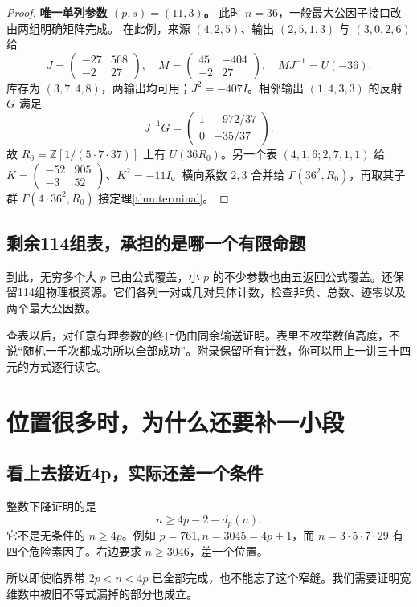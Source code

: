 \documentclass[11pt,a4paper,oneside,openany]{book}
\newcommand{\Z}{\mathbb Z}
\theoremstyle{definition}
\numberwithin{equation}{chapter}
\begin{document}
\begin{proof}
\par\noindent\textbf{唯一单列参数 $(p,s)=(11,3)$。}
此时 $n=36$，一般最大公因子接口改由两组明确矩阵完成。
在此例，来源 $(4,2,5)$、输出 $(2,5,1,3)$ 与 $(3,0,2,6)$ 给
\[
J=\begin{pmatrix}-27&568\\-2&27\end{pmatrix},\quad
M=\begin{pmatrix}45&-404\\-2&27\end{pmatrix},\quad MJ^{-1}=U(-36).
\]
库存为 $(3,7,4,8)$，两输出均可用；$J^2=-407I$。相邻输出 $(1,4,3,3)$ 的反射 $G$ 满足
\[J^{-1}G=\begin{pmatrix}1&-972/37\\0&-35/37\end{pmatrix}.
\]
故 $R_0=\Z[1/(5\cdot7\cdot37)]$ 上有 $U(36R_0)$。另一个表 $(4,1,6;2,7,1,1)$ 给 $K=\left(\begin{smallmatrix}-52&905\\-3&52\end{smallmatrix}\right)$、$K^2=-11I$。横向系数 $2,3$ 合并给 $\Gamma(36^2,R_0)$，再取其子群 $\Gamma(4\cdot36^2,R_0)$ 接定理\ref{thm:terminal}。
\end{proof}

\section{剩余114组表，承担的是哪一个有限命题}
到此，无穷多个大 $p$ 已由公式覆盖，小 $p$ 的不少参数也由五返回公式覆盖。还保留114组物理根资源。它们各列一对或几对具体计数，检查非负、总数、迹零以及两个最大公因数。

查表以后，对任意有理参数的终止仍由同余输送证明。表里不枚举数值高度，不说“随机一千次都成功所以全部成功”。附录保留所有计数，你可以用上一讲三十四元的方式逐行读它。

\chapter{位置很多时，为什么还要补一小段}\label{sec:wide}
\section{看上去接近4p，实际还差一个条件}
整数下降证明的是
\[n\ge4p-2+d_p(n).
\]
它不是无条件的 $n\ge4p$。例如 $p=761,n=3045=4p+1$，而 $n=3\cdot5\cdot7\cdot29$ 有四个危险素因子。右边要求 $n\ge3046$，差一个位置。

所以即使临界带 $2p<n<4p$ 已全部完成，也不能忘了这个窄缝。我们需要证明宽维数中被旧不等式漏掉的部分也成立。
\end{document}
